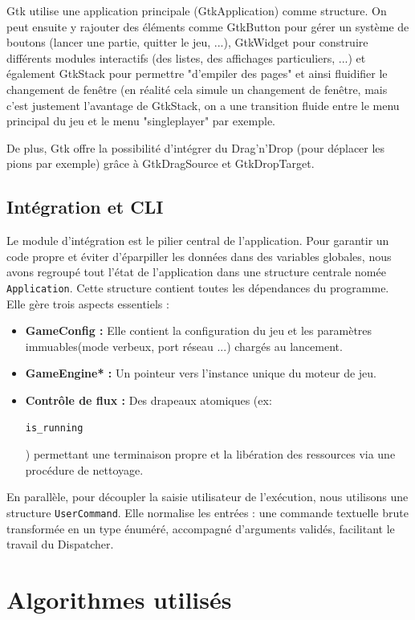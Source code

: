 \documentclass[12pt,a4paper,titlepage,oneside]{article}
\begin{document}
    Gtk utilise une application principale (GtkApplication) comme structure. On peut ensuite y rajouter des éléments comme GtkButton pour gérer un système de boutons (lancer une partie, quitter le jeu, ...), GtkWidget pour construire différents modules interactifs (des listes, des affichages particuliers, ...) et également GtkStack pour permettre "d'empiler des pages" et ainsi fluidifier le changement de fenêtre (en réalité cela simule un changement de fenêtre, mais c'est justement l'avantage de GtkStack, on a une transition fluide entre le menu principal du jeu et le menu "singleplayer" par exemple.
    
    De plus, Gtk offre la possibilité d'intégrer du Drag'n'Drop (pour déplacer les pions par exemple) grâce à GtkDragSource et GtkDropTarget. 
    
    \subsection{Intégration et CLI}
    Le module d'intégration est le pilier central de l'application. Pour garantir un code propre et éviter d'éparpiller les données dans des variables globales, nous avons regroupé tout l'état de l'application dans une structure centrale nomée \texttt{Application}.
    Cette structure contient toutes les dépendances du programme. Elle gère trois aspects essentiels : 
    \begin{itemize}
        \item \textbf{GameConfig :} Elle contient la configuration du jeu et les paramètres immuables(mode verbeux, port réseau ...) chargés au lancement.
        \item \textbf{GameEngine* :} Un pointeur vers l'instance unique du moteur de jeu.
        \item \textbf{Contrôle de flux :} Des drapeaux atomiques (ex: \begin{verbatim}is_running\end{verbatim}) permettant une terminaison propre et la libération des ressources via une procédure de nettoyage.
    \end{itemize}
    En parallèle, pour découpler la saisie utilisateur de l'exécution, nous utilisons une structure \texttt{UserCommand}. Elle normalise les entrées : une commande textuelle brute transformée en un type énuméré, accompagné d'arguments validés, facilitant le travail du Dispatcher.
    

    \section{Algorithmes utilisés} 
\end{document}
